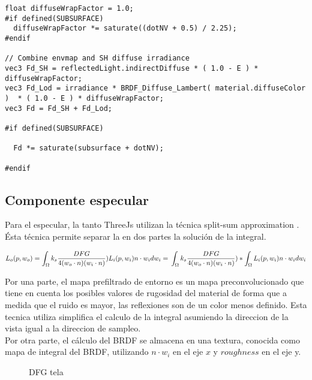     \begin{lstlisting}
float diffuseWrapFactor = 1.0;
#if defined(SUBSURFACE)
  diffuseWrapFactor *= saturate((dotNV + 0.5) / 2.25);
#endif

// Combine envmap and SH diffuse irradiance
vec3 Fd_SH = reflectedLight.indirectDiffuse * ( 1.0 - E ) * diffuseWrapFactor;
vec3 Fd_Lod = irradiance * BRDF_Diffuse_Lambert( material.diffuseColor )  * ( 1.0 - E ) * diffuseWrapFactor;
vec3 Fd = Fd_SH + Fd_Lod;

#if defined(SUBSURFACE)

  Fd *= saturate(subsurface + dotNV);

#endif
    \end{lstlisting}

  \subsection{Componente especular}
  \bgroup
    Para el especular, la tanto ThreeJs utilizan la t\'ecnica split-sum approximation
    \autocite{splitsum}. \'Esta t\'ecnica permite separar la en dos partes la soluci\'on de la
    integral.

    \begin{equation}
    L_o(p, w_o) =
    \int_{\Omega} k_s \frac{DFG}{4(w_o\cdot{n})(w_i\cdot{n})})L_i(p, w_i)n\cdot{w_i}dw_i = \\
    \int_{\Omega} k_s \frac{DFG}{4(w_o\cdot{n})(w_i\cdot{n})}) *
    \int_{\Omega}L_i(p, w_i)n\cdot{w_i}dw_i
    \end{equation}

    Por una parte, el mapa prefiltrado de entorno es un mapa preconvolucionado que tiene en cuenta
    los posibles valores de rugosidad del material de forma que a medida que el ruido es mayor, las
    reflexiones son de un color menos definido. Esta tecnica utiliza simplifica el calculo de
    la integral asumiendo la direccion de la vista igual a la direccion de sampleo.\\
    Por otra parte, el c\'alculo del BRDF se almacena en una textura, conocida como mapa de integral
    del BRDF, utilizando $n\cdot{w_i}$ en el eje $x$ y $roughness$ en el eje y.

    \begin{figure}[H]
      \vspace{0.5cm}
      \centering
      \caption{DFG tela}
    \end{figure}

